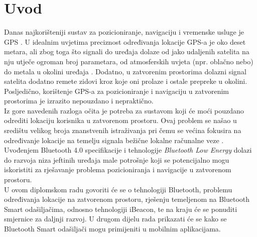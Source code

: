 \chapter{Uvod}

Danas najkorišteniji sustav za pozicioniranje, navigaciju i vremenske usluge je GPS . %
U idealnim uvjetima preciznost određivanja lokacije GPS-a je oko deset metara, ali zbog toga što signali do uređaja dolaze od jako udaljenih satelita na nju utječe ogroman broj parametara, od atmosferskih uvjeta (npr. oblačno nebo) do metala u okolini uređaja \citep{schneider2013}. 
Dodatno, u zatvorenim prostorima dolazni signal satelita dodatno remete zidovi kroz koje oni prolaze i ostale prepreke u okolini.
Posljedično, korištenje GPS-a za pozicioniranje i navigaciju u zatvorenim prostorima je izrazito nepouzdano i nepraktično.
\\

Iz gore navedenih razloga očita je potreba za sustavom koji će moći pouzdano odrediti lokaciju korisnika u zatvorenom prostoru. 
Ovaj problem se našao u središtu velikog broja znanstvenih istraživanja pri čemu se većina fokusira na određivanje lokacije na temelju signala bežične lokalne računalne veze . %
Uvođenjem Bluetooth 4.0 specifikacije i tehnologije \textit{Bluetooth Low Energy} dolazi do razvoja niza jeftinih uređaja male potrošnje koji se potencijalno mogu iskoristiti za rješavanje problema pozicioniranja i navigacije u zatvorenom prostoru.
\\

U ovom diplomskom radu govoriti će se o tehnologiji Bluetooth, problemu određivanja lokacije na zatvorenom prostoru, rješenju temeljenom na Bluetooth Smart odašiljačima, odnosno tehnologiji iBeacon, te na kraju će se ponuditi smjernice za daljnji razvoj. 
U drugom dijelu rada prikazati će se kako se Bluetooth Smart odašiljači mogu primijeniti u mobilnim aplikacijama.